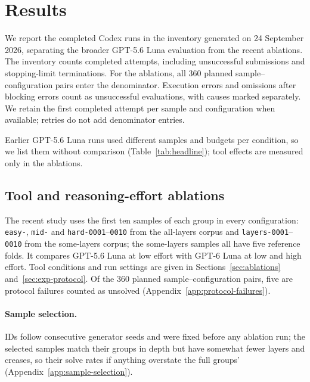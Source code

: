 \section{Results}
\label{sec:results}

We report the completed Codex runs in the inventory generated on 24 September 2026,
separating the broader GPT-5.6 Luna evaluation from the recent ablations. The inventory
counts completed attempts, including unsuccessful submissions and stopping-limit
terminations. For the ablations, all 360 planned sample--configuration pairs enter
the denominator. Execution errors and omissions after blocking errors count as
unsuccessful evaluations, with causes marked separately. We retain the first completed
attempt per sample and configuration when available; retries do not add denominator entries.

\label{sec:results-headline}
Earlier GPT-5.6 Luna runs used different samples and budgets per condition, so we list them
without comparison (Table~\ref{tab:headline}); tool effects are measured only in the ablations.

\subsection{Tool and reasoning-effort ablations}
\label{sec:results-tiers}
\label{sec:results-ablations}

The recent study uses the first ten samples of each group in every configuration:
\texttt{easy-}, \texttt{mid-} and \texttt{hard-0001}--\texttt{0010} from the all-layers corpus and
\texttt{layers-0001}--\texttt{0010} from the some-layers corpus; the some-layers samples all have five reference folds. It compares GPT-5.6 Luna at low effort with
GPT-6 Luna at low and high effort. Tool conditions and run settings are
given in Sections~\ref{sec:ablations} and~\ref{sec:exp-protocol}. Of the 360 planned
sample--configuration pairs, five are protocol failures counted as unsolved
(Appendix~\ref{app:protocol-failures}).

\paragraph{Sample selection.} IDs follow consecutive generator seeds and were fixed before any
ablation run; the selected samples match their groups in depth but have somewhat fewer layers and
creases, so their solve rates if anything overstate the full groups' (Appendix~\ref{app:sample-selection}).

